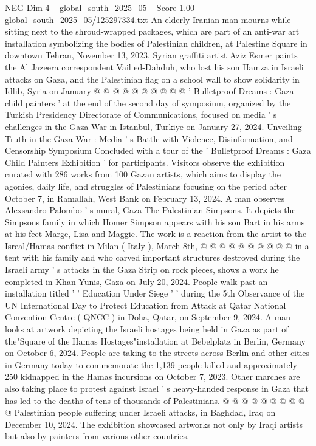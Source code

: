 \begin{textsample}{NEG Dim 4 – global\_south\_2025\_05 – Score 1.00 – global\_south\_2025\_05/125297334.txt}
An elderly Iranian man mourns while sitting next to the shroud-wrapped packages, which are part of an anti-war art installation symbolizing the bodies of Palestinian children, at Palestine Square in downtown Tehran, November 13, 2023.
Syrian graffiti artist Aziz Esmer paints the Al Jazeera correspondent Vail ed-Dahduh, who lost his son Hamza in Israeli attacks on Gaza, and the Palestinian flag on a school wall to show solidarity in Idlib, Syria on January @ @ @ @ @ @ @ @ @ @ ' Bulletproof Dreams : Gaza child painters ' at the end of the second day of symposium, organized by the Turkish Presidency Directorate of Communications, focused on media ' s challenges in the Gaza War in Istanbul, Turkiye on January 27, 2024.
Unveiling Truth in the Gaza War : Media ' s Battle with Violence, Disinformation, and Censorship Symposium Concluded with a tour of the ' Bulletproof Dreams : Gaza Child Painters Exhibition ' for participants.
Visitors observe the exhibition curated with 286 works from 100 Gazan artists, which aims to display the agonies, daily life, and struggles of Palestinians focusing on the period after October 7, in Ramallah, West Bank on February 13, 2024.
A man observes Alexsandro Palombo ' s mural, Gaza The Palestinian Simpsons.
It depicts the Simpsons family in which Homer Simpson appears with his son Bart in his arms at his feet Marge, Lisa and Maggie.
The work is a reaction from the artist to the Isreal/Hamas conflict in Milan ( Italy ), March 8th, @ @ @ @ @ @ @ @ @ @ in a tent with his family and who carved important structures destroyed during the Israeli army ' s attacks in the Gaza Strip on rock pieces, shows a work he completed in Khan Yunis, Gaza on July 20, 2024.
People walk past an installation titled ' ' Education Under Siege ' ' during the 5th Observance of the UN International Day to Protect Education from Attack at Qatar National Convention Centre ( QNCC ) in Doha, Qatar, on September 9, 2024.
A man looks at artwork depicting the Israeli hostages being held in Gaza as part of the"Square of the Hamas Hostages"installation at Bebelplatz in Berlin, Germany on October 6, 2024.
People are taking to the streets across Berlin and other cities in Germany today to commemorate the 1,139 people killed and approximately 250 kidnapped in the Hamas incursions on October 7, 2023.
Other marches are also taking place to protest against Israel ' s heavy-handed response in Gaza that has led to the deaths of tens of thousands of Palestinians. @ @ @ @ @ @ @ @ @ @ Palestinian people suffering under Israeli attacks, in Baghdad, Iraq on December 10, 2024.
The exhibition showcased artworks not only by Iraqi artists but also by painters from various other countries.

\end{textsample}
